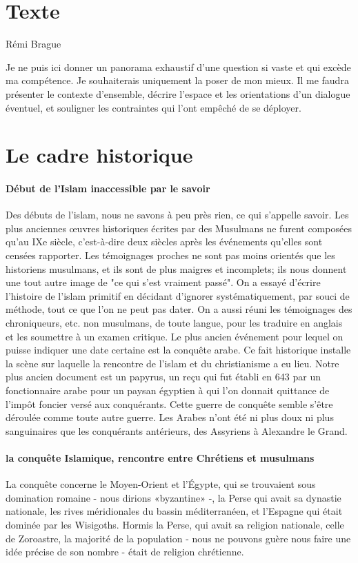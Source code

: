 \section{Texte}
Rémi Brague

Je ne puis ici donner un panorama exhaustif d'une question si vaste et qui excède ma compétence. Je souhaiterais uniquement la poser de mon mieux. Il me faudra présenter le contexte d'ensemble, décrire l'espace et les orientations d'un dialogue éventuel, et souligner les contraintes qui l'ont empêché de se déployer.

\section{Le cadre historique}

\paragraph{Début de l'Islam inaccessible par le savoir}
Des débuts de l'islam, nous ne savons à peu près rien, ce qui s'appelle savoir. Les plus anciennes œuvres historiques écrites par des Musulmans ne furent composées qu'au IXe siècle, c'est-à-dire deux siècles après les événements qu'elles sont censées rapporter. Les témoignages proches ne sont pas moins orientés que les historiens musulmans, et ils sont de plus maigres et incomplets; ils nous donnent une tout autre image de "ce qui s'est vraiment passé". On a essayé d'écrire l'histoire de l'islam primitif en décidant d'ignorer systématiquement, par souci de méthode, tout ce que l'on ne peut pas dater. 
On a aussi réuni les témoignages des chroniqueurs, etc. non musulmans, de toute langue, pour les traduire en anglais et les soumettre à un examen critique.
Le plus ancien événement pour lequel on puisse indiquer une date certaine est la conquête arabe. Ce fait historique installe la scène sur laquelle la rencontre de l'islam et du christianisme a eu lieu. Notre plus ancien document est un papyrus, un reçu qui fut établi en 643 par un fonctionnaire arabe pour un paysan égyptien à qui l'on donnait quittance de l'impôt foncier versé aux conquérants. Cette guerre de conquête semble s'être déroulée comme toute autre guerre. Les Arabes n'ont été ni plus doux ni plus sanguinaires que les conquérants antérieurs, des Assyriens à Alexandre le Grand.

\paragraph{la conquête Islamique, rencontre entre Chrétiens et musulmans}
La conquête concerne le Moyen-Orient et l'Égypte, qui se trouvaient sous domination romaine - nous dirions «byzantine» -, la Perse qui avait sa dynastie nationale, les rives méridionales du bassin méditerranéen, et l'Espagne qui était dominée par les Wisigoths. Hormis la Perse, qui avait sa religion nationale, celle de Zoroastre, la majorité de la population - nous ne pouvons guère nous faire une idée précise de son nombre - était de religion chrétienne.
